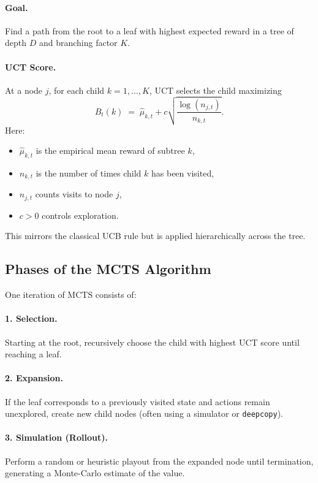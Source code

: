 \documentclass[12pt]{article}
\begin{document}
\paragraph{Goal.}
Find a path from the root to a leaf with highest expected reward in a tree of depth $D$
and branching factor $K$.

\paragraph{UCT Score.}
At a node $j$, for each child $k = 1,\dots,K$, UCT selects the child maximizing
\[
		B_t(k) \;=\; \hat{\mu}_{k,t}
		+ c \sqrt{\frac{\log(n_{j,t})}{n_{k,t}}}.
\]
Here:
\begin{itemize}
		\item $\hat{\mu}_{k,t}$ is the empirical mean reward of subtree $k$,
		\item $n_{k,t}$ is the number of times child $k$ has been visited,
		\item $n_{j,t}$ counts visits to node $j$,
		\item $c > 0$ controls exploration.
\end{itemize}
This mirrors the classical UCB rule but is applied hierarchically across the tree.

\subsection*{Phases of the MCTS Algorithm}
One iteration of MCTS consists of:

\paragraph{1. Selection.}
Starting at the root, recursively choose the child with highest UCT score until reaching a leaf.

\paragraph{2. Expansion.}
If the leaf corresponds to a previously visited state and actions remain unexplored,
create new child nodes (often using a simulator or \texttt{deepcopy}).

\paragraph{3. Simulation (Rollout).}
Perform a random or heuristic playout from the expanded node until termination,
generating a Monte-Carlo estimate of the value.
\end{document}
